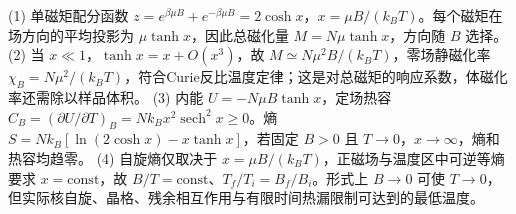 (1) 单磁矩配分函数 \(z=e^{\beta\mu B}+e^{-\beta\mu B}=2\cosh x\)，\(x=\mu B/(k_BT)\)。每个磁矩在场方向的平均投影为 \(\mu\tanh x\)，因此总磁化量 \(M=N\mu\tanh x\)，方向随 \(B\) 选择。
(2) 当 \(x\ll1\)，\(\tanh x=x+O(x^3)\)，故 \(M\simeq N\mu^2B/(k_BT)\)，零场静磁化率 \(\chi_B=N\mu^2/(k_BT)\)，符合Curie反比温度定律；这是对总磁矩的响应系数，体磁化率还需除以样品体积。
(3) 内能 \(U=-N\mu B\tanh x\)，定场热容 \(C_B=(\partial U/\partial T)_B=Nk_Bx^2\operatorname{sech}^2x\ge0\)。熵 \(S=Nk_B[\ln(2\cosh x)-x\tanh x]\)，若固定 \(B>0\) 且 \(T\to0\)，\(x\to\infty\)，熵和热容均趋零。
(4) 自旋熵仅取决于 \(x=\mu B/(k_BT)\)，正磁场与温度区中可逆等熵要求 \(x=\mathrm{const}\)，故 \(B/T=\mathrm{const}\)、\(T_f/T_i=B_f/B_i\)。形式上 \(B\to0\) 可使 \(T\to0\)，但实际核自旋、晶格、残余相互作用与有限时间热漏限制可达到的最低温度。
